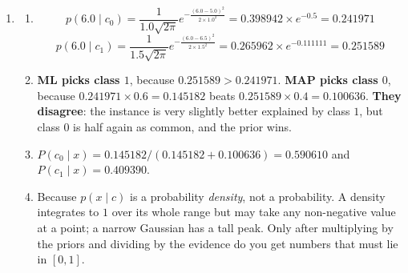 \documentclass[11pt]{article}
\begin{document}
\begin{enumerate}[leftmargin=*, itemsep=0.7em]
\item
  \begin{enumerate}[label=(\alph*)]
    \item
      \[
        p(6.0 \mid c_0) = \frac{1}{1.0\sqrt{2\pi}}
          e^{-\frac{(6.0-5.0)^2}{2 \times 1.0^2}}
          = 0.398942 \times e^{-0.5} = \mathbf{0.241971}
      \]
      \[
        p(6.0 \mid c_1) = \frac{1}{1.5\sqrt{2\pi}}
          e^{-\frac{(6.0-6.5)^2}{2 \times 1.5^2}}
          = 0.265962 \times e^{-0.111111} = \mathbf{0.251589}
      \]
    \item \textbf{ML picks class $1$}, because $0.251589 > 0.241971$.
      \textbf{MAP picks class $0$}, because
      $0.241971 \times 0.6 = \mathbf{0.145182}$ beats
      $0.251589 \times 0.4 = \mathbf{0.100636}$. \textbf{They disagree}: the
      instance is very slightly better explained by class $1$, but class $0$
      is half again as common, and the prior wins.
    \item $P(c_0 \mid x) = 0.145182 / (0.145182 + 0.100636) =
      \mathbf{0.590610}$ and $P(c_1 \mid x) = \mathbf{0.409390}$.
    \item Because $p(x \mid c)$ is a probability \emph{density}, not a
      probability. A density integrates to $1$ over its whole range but may
      take any non-negative value at a point; a narrow Gaussian has a tall
      peak. Only after multiplying by the priors and dividing by the evidence
      do you get numbers that must lie in $[0,1]$.
  \end{enumerate}


\end{enumerate}
\end{document}
